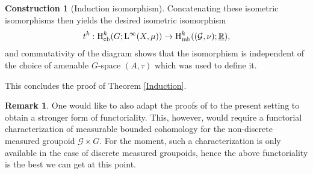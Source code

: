 \documentclass[11pt, oneside]{amsart}
\theoremstyle{definition}
\newtheorem{con}[lemma]{Construction}
\newtheorem{remark}[lemma]{Remark}
\theoremstyle{remark}
\theoremstyle{TheoremNum}
\newcommand{\Hm}{\textup{H}}
\newcommand{\Hmb}{\textup{H}_{\textup{mb}}}
\newcommand{\Hcb}{\textup{H}_{\textup{cb}}}
\newcommand{\Linf}{\mathrm{L}^{\infty}}
\newcommand{\cG}{\mathcal{G}}
\begin{document}
\begin{con}[Induction isomorphism]
Concatenating these isometric isomorphisms then yields the desired isometric isomorphism \[t^k: \Hcb^k(G;\Linf(X,\mu)) \to  \Hmb^k((\mathcal{G},\nu);\underline{\mathbb{R}}),\] and commutativity of the diagram shows that the isomorphism
is independent of the choice of amenable $G$-space $(A, \tau)$ which was  used to define it.
\end{con}
This concludes the proof of Theorem \ref{Induction}. 
 \begin{remark}
 One would like to also adapt the proofs of \cite[Proposition 10.1.3 and 10.1.5]{monod:libro} to the present setting to obtain a stronger form of functoriality. This, however, would require a functorial characterization of measurable bounded cohomology for the non-discrete measured groupoid $\mathcal{G}\times G$. For the moment, such a characterization is only available in the case of discrete measured groupoids, hence the above functoriality is the best we can get at this point.
 \end{remark}
\end{document}
